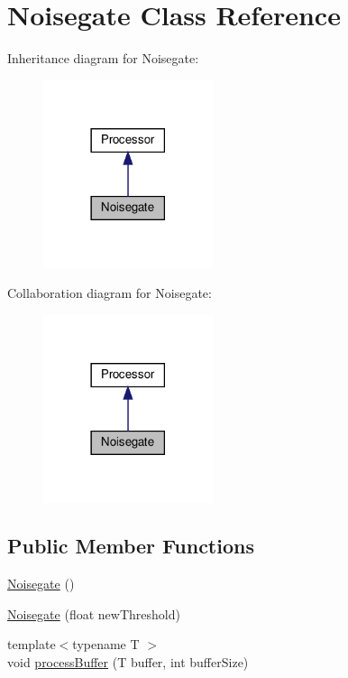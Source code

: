 \hypertarget{classNoisegate}{}\section{Noisegate Class Reference}
\label{classNoisegate}


Inheritance diagram for Noisegate\+:
\nopagebreak
\begin{figure}[H]
\begin{center}
\leavevmode
\includegraphics[width=141pt]{dc/d99/classNoisegate__inherit__graph}
\end{center}
\end{figure}


Collaboration diagram for Noisegate\+:
\nopagebreak
\begin{figure}[H]
\begin{center}
\leavevmode
\includegraphics[width=141pt]{da/d40/classNoisegate__coll__graph}
\end{center}
\end{figure}
\subsection*{Public Member Functions}
\begin{DoxyCompactItemize}
\item 
\hyperlink{classNoisegate_a15c5621437e7378814c69a58fc60b326}{Noisegate} ()
\item 
\hyperlink{classNoisegate_a4dc5881a80f29ebc6e9be12dae2bd632}{Noisegate} (float new\+Threshold)
\item 
{\footnotesize template$<$typename T $>$ }\\void \hyperlink{classNoisegate_aee5ff92d38286e509055fa6d117415fd}{process\+Buffer} (T buffer, int buffer\+Size)
\end{DoxyCompactItemize}


